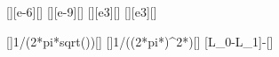 [\micro\henry][e-6][\henry]
[\nano\farad][e-9][\farad]
[\kilo\hertz][e3][\hertz]
[\kilo\hertz][e3][\hertz]

[]{1/(2*pi*sqrt(\LzX*\CX))}[\hertz]
[]{1/((2*pi*\faX)^2*\CX)}[\henry]
[L_0-L_1]{\LzX-\LaX}[\henry]

